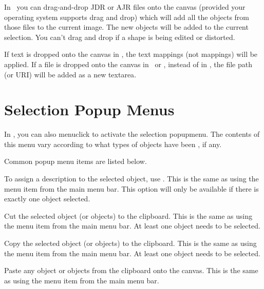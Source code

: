 In \selectmode\ you can \gls{drag-and-drop} \gls{JDR} or \gls{AJR}
files onto the \gls{canvas} (provided your operating system supports
drag and drop) which will add all the objects from those files to
the current image. The new objects will be added to the current
selection. You can't drag and drop if a shape is being edited or
distorted.

If text is dropped onto the \gls{canvas} in \selectmode, the text
mappings (not  mappings) will be applied. If a file is
dropped onto the \gls{canvas} in \textmode\ or \mathsmode, instead of
in \selectmode, the file path (or URI) will be added as a new \gls{textarea}.

\section{Selection Popup Menus}
\label{sec:selectpopups}

In \selectmode, you can also \gls{menuclick} to activate the
selection \gls{popupmenu}. The contents of this menu vary according to
what types of \glspl*{object} have been \selected, if any.



Common popup menu items are listed below.


To assign a description to the selected \gls{object}, use
. This is the same as using the
 menu item from the main menu bar.
This option will only be available if there is exactly one
\gls{object} selected.


Cut the selected \gls{object} (or \glspl{object}) to the clipboard.
This is the same as using the  menu item from the
main menu bar. At least one \gls{object} needs to be selected.


Copy the selected \gls{object} (or \glspl{object}) to the clipboard.
This is the same as using the  menu item from the
main menu bar. At least one \gls{object} needs to be selected.


Paste any \gls{object} or \glspl{object} from the clipboard onto the
\gls{canvas}.
This is the same as using the  menu item from the
main menu bar.

